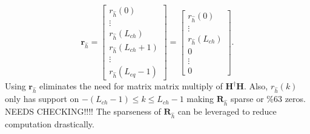 \begin{equation}
\mathbf{r}_{\hat{h}} = 
\begin{bmatrix} r_{\hat{h}}(0) \\ \vdots \\ r_{\hat{h}}(L_{ch}) \\ r_{\hat{h}}(L_{ch}+1) \\ \vdots \\ r_{\hat{h}}(L_{eq}-1)\end{bmatrix} =
\begin{bmatrix} r_{\hat{h}}(0) \\ \vdots \\ r_{\hat{h}}(L_{ch}) \\ 0 \\ \vdots \\ 0  \end{bmatrix}.
\end{equation} 
Using $\mathbf{r}_{\hat{h}}$ eliminates the need for matrix matrix multiply of $\mathbf{H}^\dagger\mathbf{H}$.
Also, $r_{\hat{h}}(k)$ only has support on $-(L_{ch}-1) \leq k \leq L_{ch}-1$ making $\mathbf{R}_{\hat{h}}$ sparse or $\%63$ zeros. NEEDS CHECKING!!!!
The sparseness of $\mathbf{R}_{\hat{h}}$ can be leveraged to reduce computation drastically.

